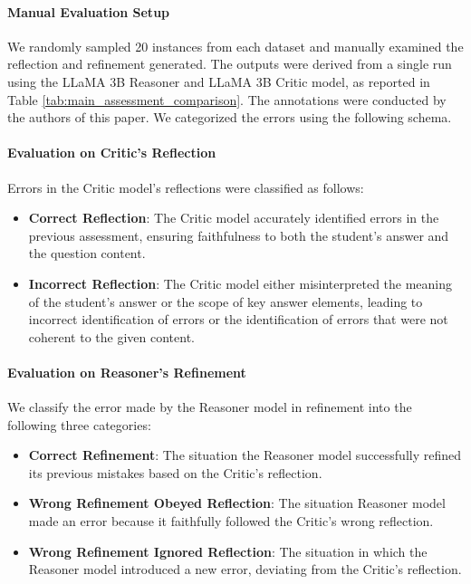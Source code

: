 \paragraph{Manual Evaluation Setup} We randomly sampled 20 instances from each dataset and manually examined the reflection and refinement generated. The outputs were derived from a single run using the LLaMA 3B Reasoner and LLaMA 3B Critic model, as reported in Table \ref{tab:main_assessment_comparison}. The annotations were conducted by the authors of this paper. We categorized the errors using the following schema.

\paragraph{Evaluation on Critic's Reflection} Errors in the Critic model's reflections were classified as follows:
\begin{itemize}[leftmargin=*,noitemsep,topsep=0pt]
\item \textbf{Correct Reflection}: The Critic model accurately identified errors in the previous assessment, ensuring faithfulness to both the student's answer and the question content.
\item \textbf{Incorrect Reflection}: The Critic model either misinterpreted the meaning of the student's answer or the scope of key answer elements, leading to incorrect identification of errors or the identification of errors that were not coherent to the given content.
\end{itemize}

\paragraph{Evaluation on Reasoner's Refinement} We classify the error made by the Reasoner model in refinement into the following three categories:
\begin{itemize}[leftmargin=*,noitemsep,topsep=0pt]
\item \textbf{Correct Refinement}: The situation the Reasoner model successfully refined its previous mistakes based on the Critic's reflection.
\item \textbf{Wrong Refinement Obeyed Reflection}: The situation Reasoner model made an error because it faithfully followed the Critic's wrong reflection.
\item \textbf{Wrong Refinement Ignored Reflection}: The situation in which the Reasoner model introduced a new error, deviating from the Critic's reflection.
\end{itemize}

